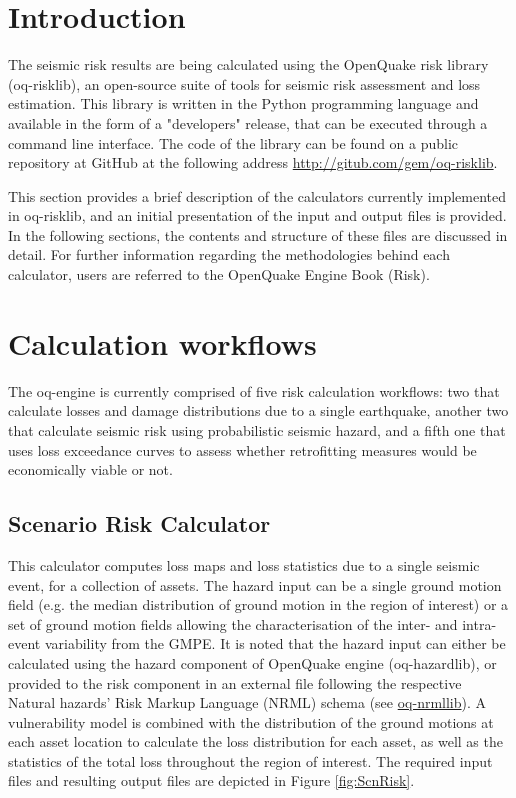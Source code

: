 \section{Introduction}
The seismic risk results are being calculated using the OpenQuake risk library (oq-risklib), an open-source suite of tools for seismic risk assessment and loss estimation. This library is written in the Python programming language and available in the form of a "developers" release, that can be executed through a command line interface. The code  of the library can be found on a public repository at GitHub at the following address \href{http://gitub.com/gem/oq-risklib}{http://gitub.com/gem/oq-risklib}.

This section provides a brief description of the calculators currently implemented in oq-risklib, and an initial presentation of the input and output files is provided. In the following sections, the contents and structure of these files are discussed in detail. For further information regarding the methodologies behind each calculator, users are referred to the OpenQuake Engine Book (Risk).

\section{Calculation workflows}
\label{sec:riskCalculators}
The oq-engine is currently comprised of five risk calculation workflows: two that calculate losses and damage distributions due to a single earthquake, another two that calculate seismic risk using probabilistic seismic hazard, and a fifth one that uses loss exceedance curves to assess whether retrofitting measures would be economically viable or not. 

\subsection{Scenario Risk Calculator}
This calculator computes loss maps and loss statistics due to a single seismic event, for a collection of assets. The hazard input can be a single ground motion field (e.g. the median distribution of ground motion in the region of interest) or a set of ground motion fields allowing the characterisation of the inter- and intra-event variability from the GMPE. It is noted that the hazard input can either be calculated using the hazard component of OpenQuake engine (oq-hazardlib), or provided to the risk component in an external file following the respective Natural hazards' Risk Markup Language (NRML) schema (see \href{http://gitub.com/gem/oq-nrmllib}{oq-nrmllib}).
A vulnerability model is combined with the distribution of the ground motions at each asset location to calculate the loss distribution for each asset, as well as the statistics of the total loss throughout the region of interest. The required input files and resulting output files are depicted in Figure \ref{fig:ScnRisk}.

